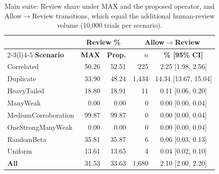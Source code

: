 \begin{table}[!t]
\caption{Main suite: Review share under MAX and the proposed operator, and Allow$\to$Review transitions, which equal the additional human-review volume (10,000 trials per scenario).}
\label{tab:mc-main-vs-max}
\centering\scriptsize
\setlength{\tabcolsep}{3pt}
\begin{tabular}{@{}lrrrc@{}}
\toprule
 & \multicolumn{2}{c}{\textbf{Review \%}} & \multicolumn{2}{c}{\textbf{Allow$\to$Review}} \\
\cmidrule(lr){2-3}\cmidrule(l){4-5}
\textbf{Scenario} & \textbf{MAX} & \textbf{Prop.} & \textbf{$n$} & \textbf{\% [95\% CI]} \\
\midrule
Correlated & 50.26 & 52.51 & 225 & 2.25 [1.98, 2.56] \\
Duplicate & 33.90 & 48.24 & 1,434 & 14.34 [13.67, 15.04] \\
HeavyTailed & 18.80 & 18.91 & 11 & 0.11 [0.06, 0.20] \\
ManyWeak & 0.00 & 0.00 & 0 & 0.00 [0.00, 0.04] \\
MediumCorroboration & 99.87 & 99.87 & 0 & 0.00 [0.00, 0.04] \\
OneStrongManyWeak & 0.00 & 0.00 & 0 & 0.00 [0.00, 0.04] \\
RandomBeta & 35.81 & 35.87 & 6 & 0.06 [0.03, 0.13] \\
Uniform & 13.61 & 13.65 & 4 & 0.04 [0.02, 0.10] \\
\midrule
\textbf{All} & 31.53 & 33.63 & 1,680 & 2.10 [2.00, 2.20] \\
\bottomrule
\end{tabular}
\end{table}
